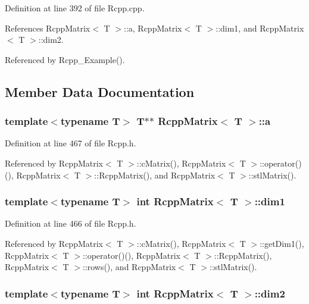 Definition at line 392 of file Rcpp.cpp.

References RcppMatrix$<$ T $>$::a, RcppMatrix$<$ T $>$::dim1, and RcppMatrix$<$ T $>$::dim2.

Referenced by Rcpp\_\-Example().

\subsection{Member Data Documentation}
\hypertarget{classRcppMatrix_a3f4dad8e2aed525c9b20e98d262ec31e}{
\subsubsection[{a}]{\setlength{\rightskip}{0pt plus 5cm}template$<$typename T$>$ T$\ast$$\ast$ {\bf RcppMatrix}$<$ T $>$::{\bf a}}}
\label{classRcppMatrix_a3f4dad8e2aed525c9b20e98d262ec31e}


Definition at line 467 of file Rcpp.h.

Referenced by RcppMatrix$<$ T $>$::cMatrix(), RcppMatrix$<$ T $>$::operator()(), RcppMatrix$<$ T $>$::RcppMatrix(), and RcppMatrix$<$ T $>$::stlMatrix().\hypertarget{classRcppMatrix_a3b2f3ef7c2b482e4f7e7f4f96b787128}{
\subsubsection[{dim1}]{\setlength{\rightskip}{0pt plus 5cm}template$<$typename T$>$ int {\bf RcppMatrix}$<$ T $>$::{\bf dim1}}}
\label{classRcppMatrix_a3b2f3ef7c2b482e4f7e7f4f96b787128}


Definition at line 466 of file Rcpp.h.

Referenced by RcppMatrix$<$ T $>$::cMatrix(), RcppMatrix$<$ T $>$::getDim1(), RcppMatrix$<$ T $>$::operator()(), RcppMatrix$<$ T $>$::RcppMatrix(), RcppMatrix$<$ T $>$::rows(), and RcppMatrix$<$ T $>$::stlMatrix().\hypertarget{classRcppMatrix_ad01bc64d89dcc475f7c90f1580bf5d52}{
\subsubsection[{dim2}]{\setlength{\rightskip}{0pt plus 5cm}template$<$typename T$>$ int {\bf RcppMatrix}$<$ T $>$::{\bf dim2}}}
\label{classRcppMatrix_ad01bc64d89dcc475f7c90f1580bf5d52}


